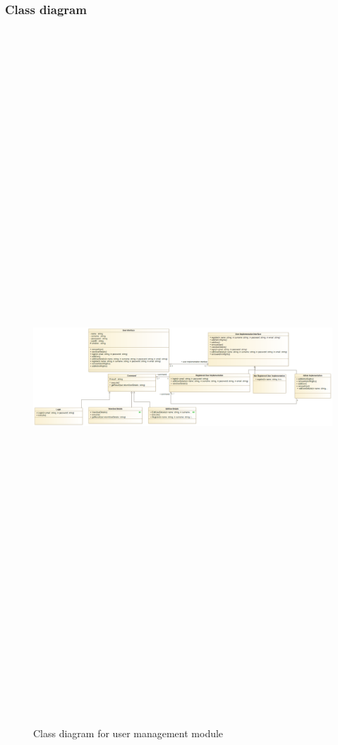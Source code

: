 \subsubsection{Class diagram}
\begin{figure}[H]
	\includegraphics[width=12cm,height=26cm,keepaspectratio]{Users/Pictures/User_Class_Diagram.png}
	\caption{Class diagram for user management module}\label{visina8}
\end{figure}

